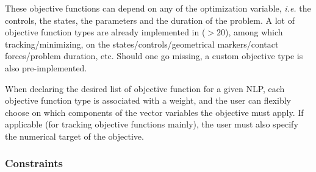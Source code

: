 These objective functions can depend on any of the optimization variable, \textit{i.e.} the controls, the states, the parameters and the duration of the problem. A lot of objective function types are already implemented in \bioptim ($>20$), among which tracking/minimizing, on the states/controls/geometrical markers/contact forces/problem duration, etc. Should one go missing, a custom objective type is also pre-implemented.

When declaring the desired list of objective function for a given NLP, each objective function type is associated with a weight, and the user can flexibly choose on which components of the vector variables the objective must apply. If applicable (for tracking objective functions mainly), the user must also specify the numerical target of the objective.

\subsubsection{Constraints}